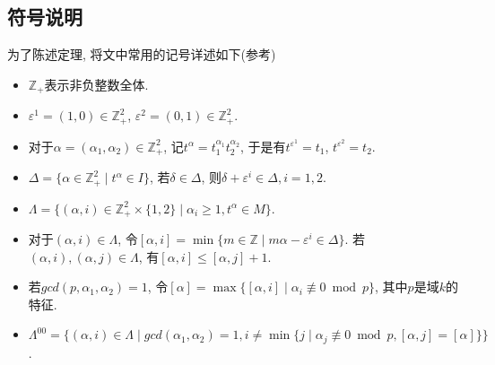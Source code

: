 \subsection{符号说明} %
\label{subsec:符号}
为了陈述定理, 将文中常用的记号详述如下(参考\cite{MR86f:18017})
\begin{itemize}
	\item $\mathbb{Z}_+$表示非负整数全体. 
	\item $\varepsilon^1 = (1, 0)\in \mathbb{Z}_+^2$, $\varepsilon^2 = (0, 1)\in \mathbb{Z}_+^2$.
	\item 对于$\alpha = (\alpha_1,\alpha_2) \in \mathbb{Z}_+^2$, 记$t^{\alpha}=t_1^{\alpha_1}t_2^{\alpha_2}$, 于是有$t^{\varepsilon^1}=t_1$, $t^{\varepsilon^2}=t_2$. 
	\item $\Delta=\{\alpha\in\mathbb{Z}_+^2\mid  t^{\alpha}\in I\}$, 若$\delta \in \Delta$, 则$\delta+\varepsilon^i \in \Delta, i=1, 2$. 
	\item $\Lambda=\{(\alpha, i)\in\mathbb{Z}_+^2 \times \{1, 2\}\mid  \alpha_i\geq 1, t^{\alpha}\in M\}$. 
	\item 对于$(\alpha, i)\in\Lambda$, 令{\color{blue}$[\alpha, i]=\min\{m\in \mathbb{Z}\mid m\alpha - \varepsilon^i\in \Delta\}$}. 
	若$(\alpha, i), (\alpha, j)\in \Lambda$, 有$[\alpha, i]\leq [\alpha, j]+1$. 
	\item 若$gcd(p, \alpha_1, \alpha_2)=1$, 令$[\alpha]=\max\{[\alpha, i]\mid  \alpha_i  \not\equiv 0 \bmod p\}$, 其中$p$是域$k$的特征.
	\item {\color{blue} $\Lambda^{00}= \big\{(\alpha, i)\in \Lambda\mid  gcd(\alpha_1, \alpha_2)=1, i\neq \min\{j\mid \alpha_j\not\equiv 0 \bmod p, [\alpha, j]=[\alpha]\} \big\}$}. 
\end{itemize}

